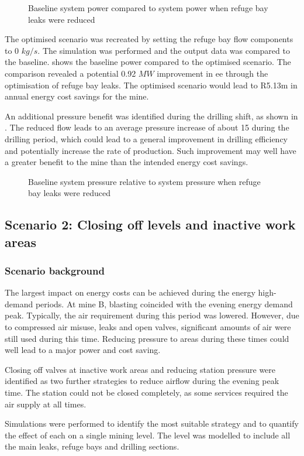 	\par 
	\begin{figure}[h!]
		\centering
		
		\caption{Baseline system power compared to system power when refuge bay leaks were reduced}
		\label{fig: RefugeBay Power.}
	\end{figure} 
	The optimised scenario was recreated by setting the refuge bay flow components to 0 $kg/s$. The simulation was performed and the output data was compared to the baseline.  shows the baseline power compared to the optimised scenario. The comparison revealed a potential 0.92 $MW$ improvement in \gls{ee} through the optimisation of refuge bay leaks. The optimised scenario would lead to R5.13m in annual energy cost savings for the mine.
	\par
	An additional pressure benefit was identified during the drilling shift, as shown in . The reduced flow leads to an average pressure increase of about 15  during the drilling period, which could lead to a general improvement in drilling efficiency and potentially increase the rate of production. Such improvement may well have a greater benefit to the mine than the intended energy cost savings.
	\begin{figure}[h!]
		\centering
		
		\caption{Baseline system pressure relative to system pressure when refuge bay leaks were reduced}
		\label{fig: RefugeBay Pressures.}
	\end{figure} 
	\subsection{Scenario 2: Closing off levels and inactive work areas}
	\subsubsection{Scenario background}
	The largest impact on energy costs can be achieved during the energy high-demand periods. At mine B, blasting coincided with the evening energy demand peak. Typically, the air requirement during this period was lowered. However, due to compressed air misuse, leaks and open valves, significant amounts of air were still used during this time. Reducing pressure to areas during these times could well lead to a major power and cost saving. 
	\par 
	Closing off valves at inactive work areas and reducing station pressure were identified as two further strategies to reduce airflow during the evening peak time. The station could not be closed completely, as some services required the air supply at all times. 
	\par 
	Simulations were performed to identify the most suitable strategy and to quantify the effect of each on a single mining level. The level was modelled to include all the main leaks, refuge bays and drilling sections.  
